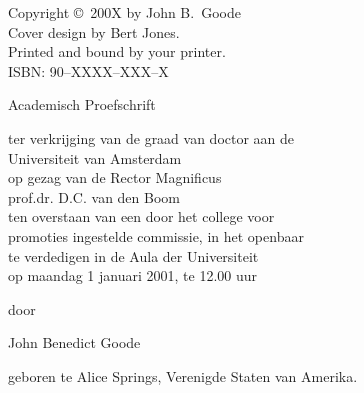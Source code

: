 {%
%
\noindent%
Copyright \copyright\ 200X by John B.\ Goode\\[2ex] %
Cover design by Bert Jones.\\                       %
Printed and bound by your printer.\\[2ex]           %
ISBN: 90--XXXX--XXX--X                              %



\clearpage
\par\vskip 2cm
\begin{center}
\printtitle
\par\vspace {6cm}
{\large \sc Academisch Proefschrift}
\par\vspace {1cm}
{\large ter verkrijging van de graad van doctor aan de\\
Universiteit van Amsterdam\\
op gezag van de Rector Magnificus\\
prof.dr. D.C. van den Boom\\                                 %
ten overstaan van een door het college voor\\
promoties ingestelde commissie, in het openbaar\\
te verdedigen in de Aula der Universiteit \\        %
op maandag 1 januari 2001, te 12.00 uur \\ }        %
\par\vspace {1cm} {\large door}
\par \vspace {1cm} %
{\Large John Benedict Goode}                        %
\par\vspace {1cm} %
{\large geboren te Alice Springs, Verenigde Staten van Amerika.} %
\end{center}

}
